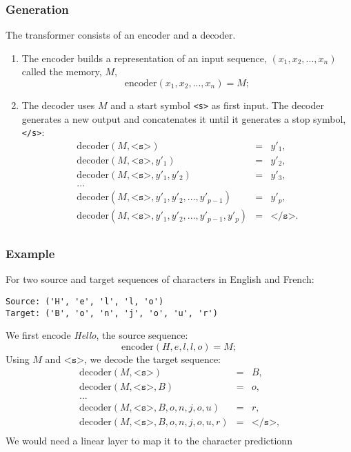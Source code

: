 \begin{frame}[fragile]
\frametitle{Generation}\color{structure}
The transformer consists of  an encoder and a decoder.
\begin{enumerate}\color{structure}
\item The encoder builds a representation of an input sequence, $(x_1, x_2, ..., x_n)$ called the memory, $M$,
\[
\text{encoder}(x_1, x_2, ..., x_n) = M;
\]
\item The decoder uses $M$ and a start symbol \verb=<s>= as first input. The decoder generates a new output and concatenates it until it generates a stop symbol, \verb=</s>=:
\[
\begin{array}{rcl}
\text{decoder}(M, \texttt{<s>}) &= &y'_1,\\
\text{decoder}(M, \texttt{<s>}, y'_1) &=& y'_2,\\
\text{decoder}(M, \texttt{<s>}, y'_1, y'_2) & = & y'_3,\\
...\\
\text{decoder}(M, \texttt{<s>}, y'_1, y'_2, ..., y'_{p-1}) & = & y'_p,\\
\text{decoder}(M, \texttt{<s>}, y'_1, y'_2, ..., y'_{p-1}, y'_{p})& = & \texttt{</s>}.\\
\end{array}
\]
\end{enumerate}  
\end{frame}

\begin{frame}[fragile]
\frametitle{Example}\color{structure}
For two source and target sequences of characters in English and French:
\begin{verbatim}
Source: ('H', 'e', 'l', 'l, 'o')
Target: ('B', 'o', 'n', 'j', 'o', 'u', 'r')
 \end{verbatim}
 We first encode \textit{Hello}, the source sequence:
\[
\text{encoder}(H, e, l, l, o) = M;
\]
Using $M$ and  $\texttt{<s>}$, we decode the target sequence:
\[
\begin{array}{rcl}
\text{decoder}(M, \texttt{<s>}) & = &B,\\
\text{decoder}(M, \texttt{<s>}, B) & = &o,\\
...\\
\text{decoder}(M, \texttt{<s>}, B, o, n, j, o, u)& = &r,\\
\text{decoder}(M, \texttt{<s>}, B, o, n, j, o, u, r) & = &\texttt{</s>},\\
\end{array}
\]
 We would need a linear layer to map it to the character predictionn
\end{frame}

